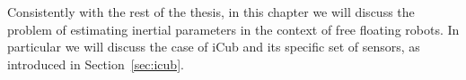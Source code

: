 Consistently with the rest of the thesis, in this chapter we will discuss the problem of estimating inertial parameters in the context of free floating robots. In particular we will discuss the case of iCub and its specific set of sensors, as introduced in Section~\ref{sec:icub}.



